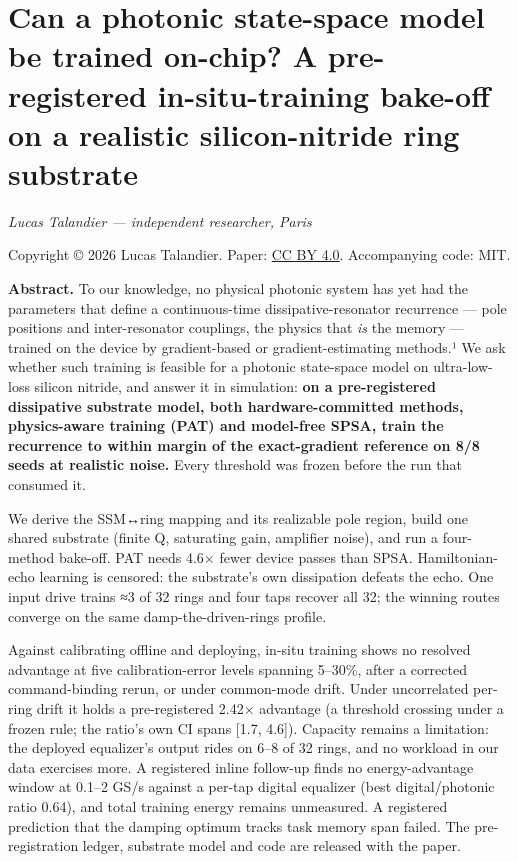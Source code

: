 \documentclass[
  10pt,
]{article}
\author{}
\date{}
\begin{document}
\section{Can a photonic state-space model be trained on-chip? A
pre-registered in-situ-training bake-off on a realistic silicon-nitride
ring
substrate}\label{can-a-photonic-state-space-model-be-trained-on-chip-a-pre-registered-in-situ-training-bake-off-on-a-realistic-silicon-nitride-ring-substrate}

\emph{Lucas Talandier --- independent researcher, Paris}

Copyright © 2026 Lucas Talandier. Paper:
\href{https://creativecommons.org/licenses/by/4.0/}{CC BY 4.0}.
Accompanying code: MIT.

\textbf{Abstract.} To our knowledge, no physical photonic system has yet
had the parameters that define a continuous-time dissipative-resonator
recurrence --- pole positions and inter-resonator couplings, the physics
that \emph{is} the memory --- trained on the device by gradient-based or
gradient-estimating methods.¹ We ask whether such training is feasible
for a photonic state-space model on ultra-low-loss silicon nitride, and
answer it in simulation: \textbf{on a pre-registered dissipative
substrate model, both hardware-committed methods, physics-aware training
(PAT) and model-free SPSA, train the recurrence to within margin of the
exact-gradient reference on 8/8 seeds at realistic noise.} Every
threshold was frozen before the run that consumed it.

We derive the SSM↔ring mapping and its realizable pole region, build one
shared substrate (finite Q, saturating gain, amplifier noise), and run a
four-method bake-off. PAT needs 4.6× fewer device passes than SPSA.
Hamiltonian-echo learning is censored: the substrate's own dissipation
defeats the echo. One input drive trains ≈3 of 32 rings and four taps
recover all 32; the winning routes converge on the same
damp-the-driven-rings profile.

Against calibrating offline and deploying, in-situ training shows no
resolved advantage at five calibration-error levels spanning 5--30\%,
after a corrected command-binding rerun, or under common-mode drift.
Under uncorrelated per-ring drift it holds a pre-registered 2.42×
advantage (a threshold crossing under a frozen rule; the ratio's own CI
spans {[}1.7, 4.6{]}). Capacity remains a limitation: the deployed
equalizer's output rides on 6--8 of 32 rings, and no workload in our
data exercises more. A registered inline follow-up finds no
energy-advantage window at 0.1--2 GS/s against a per-tap digital
equalizer (best digital/photonic ratio 0.64), and total training energy
remains unmeasured. A registered prediction that the damping optimum
tracks task memory span failed. The pre-registration ledger, substrate
model and code are released with the paper.
\end{document}
